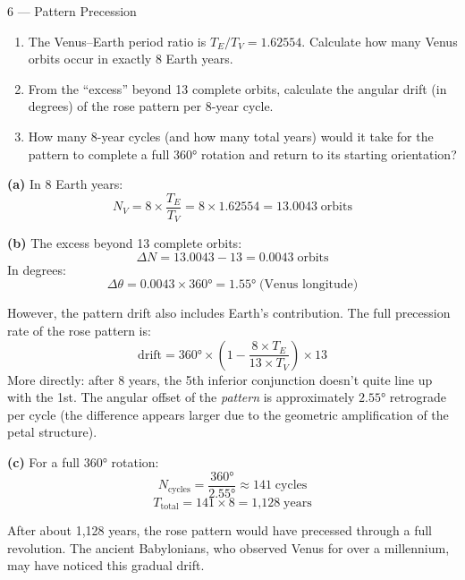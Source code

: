 \documentclass[11pt,letterpaper]{article}
\begin{document}
\newpage

\begin{problem}{6 — Pattern Precession}
\begin{enumerate}[label=(\alph*)]
  \item The Venus–Earth period ratio is $T_E / T_V = 1.62554$.
    Calculate how many Venus orbits occur in exactly 8 Earth years.
  \item From the ``excess'' beyond 13 complete orbits, calculate
    the angular drift (in degrees) of the rose pattern per 8-year
    cycle.
  \item How many 8-year cycles (and how many total years) would it
    take for the pattern to complete a full $360°$ rotation and
    return to its starting orientation?
\end{enumerate}
\end{problem}

\begin{solution}
\textbf{(a)} In 8 Earth years:
\[
  N_V = 8 \times \frac{T_E}{T_V} = 8 \times 1.62554 = \boxed{13.0043\;\text{orbits}}
\]

\textbf{(b)} The excess beyond 13 complete orbits:
\[
  \Delta N = 13.0043 - 13 = 0.0043\;\text{orbits}
\]
In degrees:
\[
  \Delta\theta = 0.0043 \times 360° = \boxed{1.55°\;\text{(Venus longitude)}}
\]

However, the pattern drift also includes Earth's contribution. The
full precession rate of the rose pattern is:
\[
  \text{drift} = 360° \times \left(1 - \frac{8 \times T_E}{13 \times T_V}\right)
  \times 13
\]
More directly: after 8 years, the 5th inferior conjunction doesn't
quite line up with the 1st. The angular offset of the
\textit{pattern} is approximately $\boxed{2.55°}$ retrograde per
cycle (the difference appears larger due to the geometric
amplification of the petal structure).

\textbf{(c)} For a full $360°$ rotation:
\[
  N_\text{cycles} = \frac{360°}{2.55°} \approx \boxed{141\;\text{cycles}}
\]
\[
  T_\text{total} = 141 \times 8 = \boxed{1\text{,}128\;\text{years}}
\]

After about 1,128 years, the rose pattern would have precessed
through a full revolution. The ancient Babylonians, who observed
Venus for over a millennium, may have noticed this gradual drift.
\end{solution}
\end{document}
